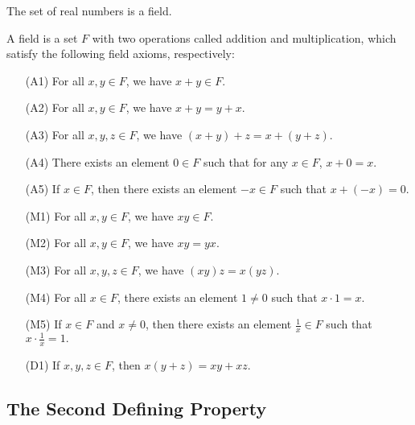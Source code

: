 \documentclass[a4paper]{report}
\begin{document}
The set of real numbers is a field.

\begin{definition}[Fields]\label{Field}
   A field is a set \( F  \) with two operations called addition and multiplication, which satisfy the following field axioms, respectively:
    \begin{enumerate}
        \item[(A1)] For all \( x,y \in F  \), we have \( x + y \in F  \). 
        \item[(A2)] For all \( x,y \in F  \), we have \( x + y = y + x  \).
        \item[(A3)] For all \( x,y,z \in F  \), we have \( (x+y) + z = x + (y + z) \). 
        \item[(A4)] There exists an element \( 0 \in F  \) such that for any \( x \in F  \), \(  x + 0 = x  \).
        \item[(A5)] If \( x \in F  \), then there exists an element \( -x \in F  \) such that \( x + (-x) = 0 \).
        \item[(M1)] For all \( x,y \in F  \), we have \( xy \in F  \). 
        \item[(M2)] For all \( x,y \in F  \), we have \( xy = yx  \). 
        \item[(M3)] For all \( x,y,z \in F  \), we have \( (xy)z = x(yz) \).
        \item[(M4)] For all \( x \in F  \), there exists an element \( 1 \neq 0  \) such that \( x \cdot 1 =x  \).
        \item[(M5)] If \( x \in F  \) and \( x \neq 0  \), then there exists an element \( \frac{  1  }{ x }  \in F  \) such that \(  x \cdot \frac{ 1 }{ x }  = 1.  \)
        \item[(D1)] If \( x,y,z \in F  \), then \( x(y+z) = xy + xz \).
    \end{enumerate}   
\end{definition}

\subsection{The Second Defining Property}
\end{document}
